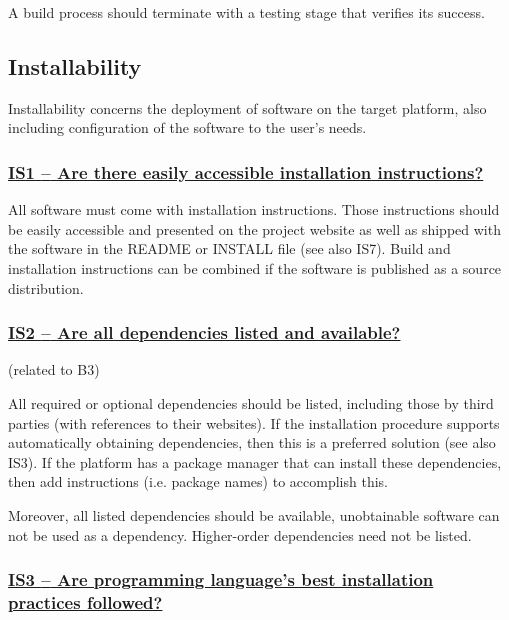 \documentclass[a4paper,11pt]{article}
\newcommand{\indicator}[1]{\subsubsection*{\underline{#1}}}
\begin{document}
A build process should terminate with a testing stage that verifies its success.

\subsection{Installability}\label{sec:ins}

Installability concerns the deployment of software on the target platform, also
including configuration of the software to the user's needs.

\newcommand{\isOneName}{IS1}
\newcommand{\isOneID}{\isOneName}
\newcommand{\isOneText}{Are there easily accessible installation instructions?}
\indicator{\isOneName{ }--{ }\isOneText}\label{id:is1} 

All software must come with installation instructions. Those instructions should
be easily accessible and presented on the project website as well as shipped
with the software in the README or INSTALL file (see also IS7). Build and installation
instructions can be combined if the software is published as a source
distribution.

\newcommand{\isTwoName}{IS2}
\newcommand{\isTwoID}{\isTwoName}
\newcommand{\isTwoText}{Are all dependencies listed and available?}
\indicator{\isTwoName{ }--{ }\isTwoText}\label{id:is2} 
(related to B3)

All required or optional dependencies should be listed, including those by
third parties (with references to their websites). If the installation
procedure supports automatically obtaining dependencies, then this is a
preferred solution (see also IS3). If the platform has a package manager that
can install these dependencies, then add instructions (i.e. package names) to
accomplish this.

Moreover, all listed dependencies should be available, unobtainable software
can not be used as a dependency. Higher-order dependencies need not be listed.
%
%

\newcommand{\isThreeName}{IS3}
\newcommand{\isThreeID}{\isThreeName}
\newcommand{\isThreeText}{Are programming language's best installation practices followed?}
\indicator{\isThreeName{ }--{ }\isThreeText}\label{id:is3} 
\end{document}
